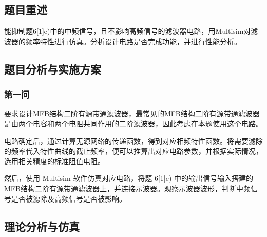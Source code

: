 \documentclass[./测控三级项目.tex]{subfiles} %
\begin{document}
	\subsection{题目重述}
		\begin{compactenum}
			\item 能抑制题6[1]e)中的中频信号，且不影响高频信号的滤波器电路，用Multisim对滤波器的频率特性进行仿真。分析设计电路是否完成功能，并进行性能分析。
		\end{compactenum}
	\subsection{题目分析与实施方案}
		\subsubsection{第一问}
			要求设计MFB结构二阶有源带通滤波器，最常见的MFB结构二阶有源带通滤波器是由两个电容和两个电阻共同作用的二阶滤波器，因此考虑在本题使用这个电路。 \par
			电路确定后，通过计算无源网络的传递函数，得到对应相频特性函数。将需要滤除的频率代入特性曲线的截止频率，便可以推算出对应电路参数，并根据实际情况，选用相关精度的标准阻值电阻。 \par
			然后，使用 Multisim 软件仿真对应电路，将题 6[1]e) 中的输出信号输入搭建的MFB结构二阶有源带通滤波器上，并连接示波器。观察示波器波形，判断中频信号是否被滤除及高频信号是否被影响。\par
		
	
	\subsection{理论分析与仿真}
\end{document}
